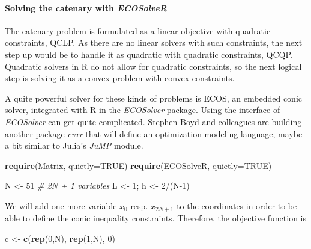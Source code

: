 \documentclass[]{article}
\newenvironment{Shaded}{\begin{snugshade}}{\end{snugshade}}
\newcommand{\KeywordTok}[1]{\textcolor[rgb]{0.13,0.29,0.53}{\textbf{{#1}}}}
\newcommand{\DataTypeTok}[1]{\textcolor[rgb]{0.13,0.29,0.53}{{#1}}}
\newcommand{\DecValTok}[1]{\textcolor[rgb]{0.00,0.00,0.81}{{#1}}}
\newcommand{\StringTok}[1]{\textcolor[rgb]{0.31,0.60,0.02}{{#1}}}
\newcommand{\CommentTok}[1]{\textcolor[rgb]{0.56,0.35,0.01}{\textit{{#1}}}}
\newcommand{\OtherTok}[1]{\textcolor[rgb]{0.56,0.35,0.01}{{#1}}}
\newcommand{\NormalTok}[1]{{#1}}
\let\oldparagraph\paragraph
\renewcommand{\paragraph}[1]{\oldparagraph{#1}\mbox{}}
\begin{document}
\paragraph{\texorpdfstring{Solving the catenary with
\emph{ECOSolveR}}{Solving the catenary with ECOSolveR}}\label{solving-the-catenary-with-ecosolver}

The catenary problem is formulated as a linear objective with quadratic
constraints, QCLP. As there are no linear solvers with such constraints,
the next step up would be to handle it as quadratic with quadratic
constraints, QCQP. Quadratic solvers in R do not allow for quadratic
constraints, so the next logical step is solving it as a convex problem
with convex constraints.

A quite powerful solver for these kinds of problems is ECOS, an embedded
conic solver, integrated with R in the \emph{ECOSolver} package. Using
the interface of \emph{ECOSolver} can get quite complicated. Stephen
Boyd and colleagues are building another package \emph{cvxr} that will
define an optimization modeling language, maybe a bit similar to Julia's
\emph{JuMP} module.

\begin{Shaded}
\begin{Highlighting}[]
\KeywordTok{require}\NormalTok{(Matrix, }\DataTypeTok{quietly=}\OtherTok{TRUE}\NormalTok{)}
\KeywordTok{require}\NormalTok{(ECOSolveR, }\DataTypeTok{quietly=}\OtherTok{TRUE}\NormalTok{)}

\NormalTok{N <-}\StringTok{ }\DecValTok{51}                 \CommentTok{# 2N + 1 variables}
\NormalTok{L <-}\StringTok{ }\DecValTok{1}\NormalTok{; h <-}\StringTok{ }\DecValTok{2}\NormalTok{/(N}\DecValTok{-1}\NormalTok{)}
\end{Highlighting}
\end{Shaded}

We will add one more variable \(x_0\) resp. \(x_{2N+1}\) to the
coordinates in order to be able to define the conic inequality
constraints. Therefore, the objective function is

\begin{Shaded}
\begin{Highlighting}[]
\NormalTok{c <-}\StringTok{ }\KeywordTok{c}\NormalTok{(}\KeywordTok{rep}\NormalTok{(}\DecValTok{0}\NormalTok{,N), }\KeywordTok{rep}\NormalTok{(}\DecValTok{1}\NormalTok{,N), }\DecValTok{0}\NormalTok{)}
\end{Highlighting}
\end{Shaded}
\end{document}
